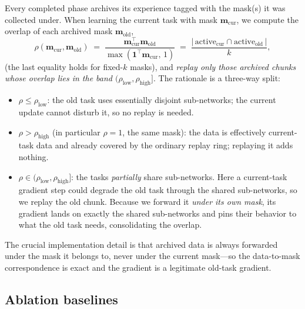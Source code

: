 \documentclass[11pt]{article}
\newcommand{\mask}{\bm{m}}                 %
\newcommand{\kk}{k}                        %
\begin{document}
Every completed phase archives its experience tagged with the mask(s) it was
collected under. When learning the current task with mask $\mask_{\mathrm{cur}}$,
we compute the overlap of each archived mask $\mask_{\mathrm{old}}$,
\begin{equation}
\rho(\mask_{\mathrm{cur}},\mask_{\mathrm{old}}) \;=\; \frac{\mask_{\mathrm{cur}}^\top \mask_{\mathrm{old}}}{\max(\bm 1^\top\mask_{\mathrm{cur}},\,1)}
\;=\; \frac{|\,\text{active}_{\mathrm{cur}}\cap\text{active}_{\mathrm{old}}\,|}{\kk},
\label{eq:rho}
\end{equation}
(the last equality holds for fixed-$\kk$ masks), and \emph{replay only those
archived chunks whose overlap lies in the band $(\rho_{\mathrm{low}},
\rho_{\mathrm{high}}]$}. The rationale is a three-way split:
\begin{itemize}[leftmargin=1.5em,itemsep=1pt]
  \item $\rho \le \rho_{\mathrm{low}}$: the old task uses essentially disjoint
  sub-networks; the current update cannot disturb it, so no replay is needed.
  \item $\rho > \rho_{\mathrm{high}}$ (in particular $\rho=1$, the same mask):
  the data is effectively current-task data and already covered by the ordinary
  replay ring; replaying it adds nothing.
  \item $\rho \in (\rho_{\mathrm{low}}, \rho_{\mathrm{high}}]$: the tasks
  \emph{partially} share sub-networks. Here a current-task gradient step could
  degrade the old task through the shared sub-networks, so we replay the old
  chunk. Because we forward it \emph{under its own mask}, its gradient lands on
  exactly the shared sub-networks and pins their behavior to what the old task
  needs, consolidating the overlap.
\end{itemize}
The crucial implementation detail is that archived data is always forwarded under
the mask it belongs to, never under the current mask---so the data-to-mask
correspondence is exact and the gradient is a legitimate old-task gradient.

\subsection{Ablation baselines}
\label{sec:baselines}
\end{document}

